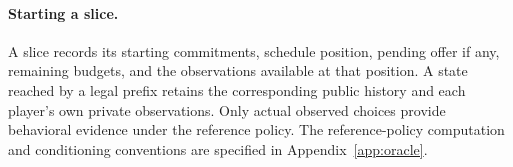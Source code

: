 \paragraph{Starting a slice.}
A slice records its starting commitments, schedule position, pending offer
if any, remaining budgets, and the observations available at that position.
A state reached by a legal prefix retains the corresponding public history
and each player's own private observations. Only actual observed choices
provide behavioral evidence under the reference policy. The reference-policy computation and conditioning conventions are specified
in Appendix~\ref{app:oracle}.
